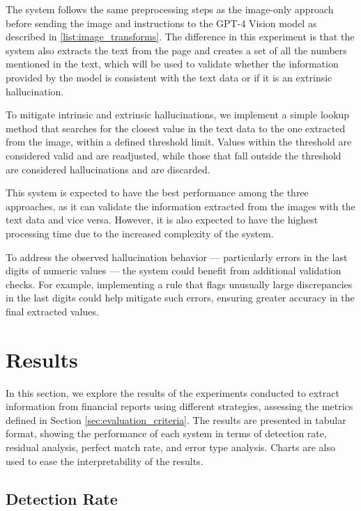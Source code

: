 \documentclass[english, 12pt, a4paper, elec, utf8, a-2b, online]{aaltothesis}
\begin{document}
The system follows the same preprocessing steps as the image-only approach before sending the image and instructions to the \ac{GPT}-4 Vision model as described in \ref{list:image_transforms}.
The difference in this experiment is that the system also extracts the text from the page and creates a set of all the numbers mentioned in the text, which will be used to validate whether the information provided by the model is consistent with the text data or if it is an extrinsic hallucination.

To mitigate intrinsic and extrinsic hallucinations, we implement a simple lookup method that searches for the closest value in the text data to the one extracted from the image, within a defined threshold limit.
Values within the threshold are considered valid and are readjusted, while those that fall outside the threshold are considered hallucinations and are discarded.

This system is expected to have the best performance among the three approaches, as it can validate the information extracted from the images with the text data and vice versa.
However, it is also expected to have the highest processing time due to the increased complexity of the system.


To address the observed hallucination behavior --- particularly errors in the last digits of numeric values --- the system could benefit from additional validation checks.
For example, implementing a rule that flags unusually large discrepancies in the last digits could help mitigate such errors, ensuring greater accuracy in the final extracted values.

\clearpage
\section{Results}

In this section, we explore the results of the experiments conducted to extract information from financial reports using different strategies, assessing the metrics defined in Section \ref{sec:evaluation_criteria}.
The results are presented in tabular format, showing the performance of each system in terms of detection rate, residual analysis, perfect match rate, and error type analysis.
Charts are also used to ease the interpretability of the results.

\subsection{Detection Rate}
\end{document}
